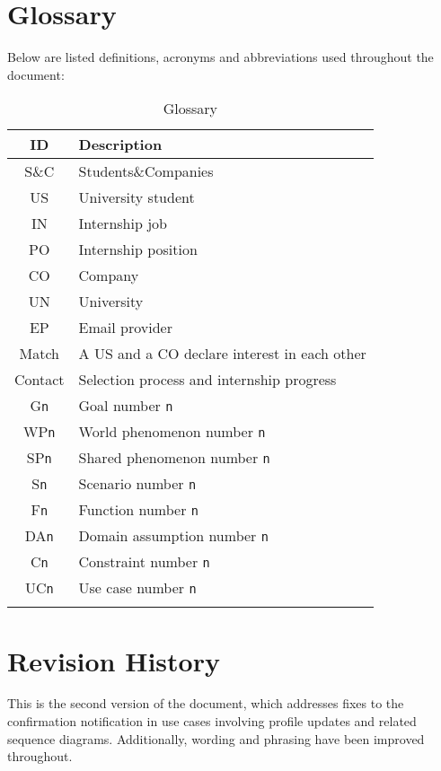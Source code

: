 \section{Glossary}
Below are listed definitions, acronyms and abbreviations used throughout the document:

\renewcommand{\arraystretch}{1.5}
\begin{longtable}{|c|p{8.5cm}|}
    \hline \rowcolor{polimiblue!40}
    \textbf{ID} & \textbf{Description} \\ \hline
    S\&C & Students\&Companies \\ \hline
    US & University student \\ \hline
    IN & Internship job \\ \hline
    PO & Internship position \\ \hline
    CO & Company \\ \hline
    UN & University \\ \hline
    EP & Email provider \\ \hline
    Match & A US and a CO declare interest in each other \\ \hline
    Contact & Selection process and internship progress \\ \hline
    G\texttt{n} & Goal number \texttt{n} \\ \hline
    WP\texttt{n} & World phenomenon number \texttt{n} \\ \hline
    SP\texttt{n} & Shared phenomenon number \texttt{n} \\ \hline
    S\texttt{n} & Scenario number \texttt{n} \\ \hline
    F\texttt{n} & Function number \texttt{n} \\ \hline
    DA\texttt{n} & Domain assumption number \texttt{n} \\ \hline
    C\texttt{n} & Constraint number \texttt{n} \\ \hline
    UC\texttt{n} & Use case number \texttt{n} \\ \hline
\caption{Glossary}
\end{longtable}

\section{Revision History}
This is the second version of the document, which addresses fixes to the confirmation notification in use cases involving profile updates and related sequence diagrams.
Additionally, wording and phrasing have been improved throughout.

